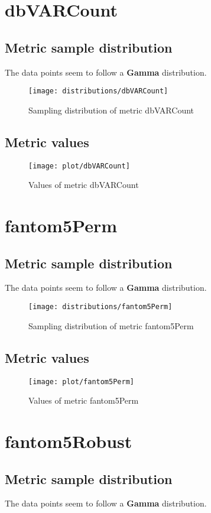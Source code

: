 \documentclass[\main/main.tex]{subfiles}
\begin{document}
\clearpage
\section{dbVARCount}
\subsection{Metric sample distribution}
The data points seem to follow a \textbf{Gamma} distribution.

\begin{figure}
  \texttt{[image: distributions/dbVARCount]}
  \caption{Sampling distribution of metric dbVARCount}
\end{figure}
\subsection{Metric values}
\begin{figure}
  \texttt{[image: plot/dbVARCount]}
  \caption{Values of metric dbVARCount}
\end{figure}

\clearpage
\section{fantom5Perm}
\subsection{Metric sample distribution}
The data points seem to follow a \textbf{Gamma} distribution.

\begin{figure}
  \texttt{[image: distributions/fantom5Perm]}
  \caption{Sampling distribution of metric fantom5Perm}
\end{figure}
\subsection{Metric values}
\begin{figure}
  \texttt{[image: plot/fantom5Perm]}
  \caption{Values of metric fantom5Perm}
\end{figure}

\clearpage
\section{fantom5Robust}
\subsection{Metric sample distribution}
The data points seem to follow a \textbf{Gamma} distribution.
\end{document}
